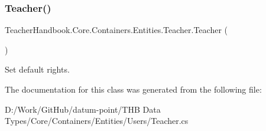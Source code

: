 \subsubsection{\texorpdfstring{Teacher()}{Teacher()}}
{\footnotesize\ttfamily Teacher\+Handbook.\+Core.\+Containers.\+Entities.\+Teacher.\+Teacher (\begin{DoxyParamCaption}{ }\end{DoxyParamCaption})}

Set default rights. 

The documentation for this class was generated from the following file\+:\begin{DoxyCompactItemize}
\item 
D\+:/\+Work/\+Git\+Hub/datum-\/point/\+T\+H\+B Data Types/\+Core/\+Containers/\+Entities/\+Users/Teacher.\+cs\end{DoxyCompactItemize}
